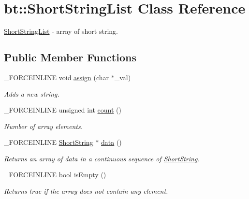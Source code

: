 \hypertarget{classbt_1_1_short_string_list}{\section{bt\-:\-:Short\-String\-List Class Reference}
\label{classbt_1_1_short_string_list}
}


\hyperlink{classbt_1_1_short_string_list}{Short\-String\-List} -\/ array of short string.  


\subsection*{Public Member Functions}
\begin{DoxyCompactItemize}
\item 
\hypertarget{classbt_1_1_short_string_list_aad84e64b2f3f073769e122394d7f14e7}{\-\_\-\-F\-O\-R\-C\-E\-I\-N\-L\-I\-N\-E void \hyperlink{classbt_1_1_short_string_list_aad84e64b2f3f073769e122394d7f14e7}{assign} (char $\ast$\-\_\-val)}\label{classbt_1_1_short_string_list_aad84e64b2f3f073769e122394d7f14e7}

\begin{DoxyCompactList}\small\item\em Adds a new string. \end{DoxyCompactList}\item 
\hypertarget{classbt_1_1_short_string_list_a31e204c7dabc2b4f55639492ebfba37d}{\-\_\-\-F\-O\-R\-C\-E\-I\-N\-L\-I\-N\-E unsigned int \hyperlink{classbt_1_1_short_string_list_a31e204c7dabc2b4f55639492ebfba37d}{count} ()}\label{classbt_1_1_short_string_list_a31e204c7dabc2b4f55639492ebfba37d}

\begin{DoxyCompactList}\small\item\em Number of array elements. \end{DoxyCompactList}\item 
\hypertarget{classbt_1_1_short_string_list_ab3cf4a6bed681039359016e884c6a03b}{\-\_\-\-F\-O\-R\-C\-E\-I\-N\-L\-I\-N\-E \hyperlink{classbt_1_1_short_string}{Short\-String} $\ast$ \hyperlink{classbt_1_1_short_string_list_ab3cf4a6bed681039359016e884c6a03b}{data} ()}\label{classbt_1_1_short_string_list_ab3cf4a6bed681039359016e884c6a03b}

\begin{DoxyCompactList}\small\item\em Returns an array of data in a continuous sequence of \hyperlink{classbt_1_1_short_string}{Short\-String}. \end{DoxyCompactList}\item 
\hypertarget{classbt_1_1_short_string_list_a2c1af2284225702bd0438827b042bfc1}{\-\_\-\-F\-O\-R\-C\-E\-I\-N\-L\-I\-N\-E bool \hyperlink{classbt_1_1_short_string_list_a2c1af2284225702bd0438827b042bfc1}{is\-Empty} ()}\label{classbt_1_1_short_string_list_a2c1af2284225702bd0438827b042bfc1}

\begin{DoxyCompactList}\small\item\em Returns true if the array does not contain any element. \end{DoxyCompactList}\end{DoxyCompactItemize}


